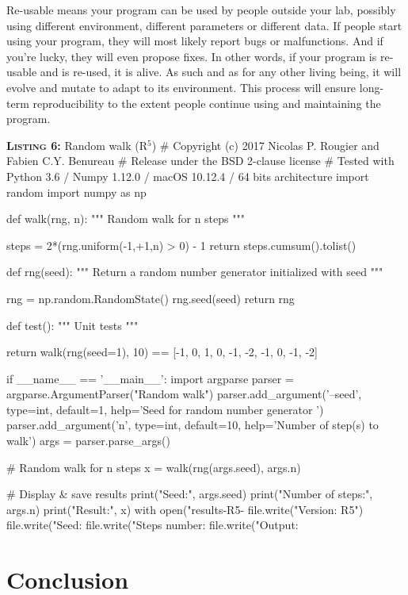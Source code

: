 \documentclass[a4paper,11pt]{article}
\begin{document}
Re-usable means your program can be used by people outside your lab,
possibly using different environment, different parameters or different data.
If people start using your program,
they will most likely report bugs or malfunctions.
And if you're lucky, they will even propose fixes.
In other words, if your program is re-usable and is re-used, it is alive.
As such and as for any other living being,
it will evolve and mutate to adapt to its environment.
This process will ensure long-term reproducibility
to the extent people continue using and maintaining the program.


\begin{code}{\textbf{\textsc{Listing 6:}} Random walk (R$^5$)}
# Copyright (c) 2017 Nicolas P. Rougier and Fabien C.Y. Benureau
# Release under the BSD 2-clause license
# Tested with Python 3.6 / Numpy 1.12.0 / macOS 10.12.4 / 64 bits architecture
import random
import numpy as np

def walk(rng, n):
    """ Random walk for n steps """

    steps = 2*(rng.uniform(-1,+1,n) > 0) - 1
    return steps.cumsum().tolist()

def rng(seed):
    """ Return a random number generator initialized with seed """ 
    
    rng = np.random.RandomState()
	rng.seed(seed)
    return rng

def test():
    """ Unit tests """

    return walk(rng(seed=1), 10) == [-1, 0, 1, 0, -1, -2, -1, 0, -1, -2]

if __name__ == '__main__':
    import argparse
    parser = argparse.ArgumentParser("Random walk")
    parser.add_argument('--seed', type=int, default=1,
                        help='Seed for random number generator ')
    parser.add_argument('n', type=int, default=10,
                        help='Number of step(s) to walk')
    args = parser.parse_args()

    # Random walk for n steps
    x = walk(rng(args.seed), args.n)

    # Display & save results
    print("Seed:", args.seed)
    print("Number of steps:", args.n)
    print("Result:",  x)
    with open("results-R5-%
        file.write("Version: R5")
        file.write("Seed: %
        file.write("Steps number: %
        file.write("Output: %
\end{code}




\clearpage
\section*{Conclusion}


\renewcommand*{\bibfont}{\small}
\printbibliography[title=References]
\end{document}
